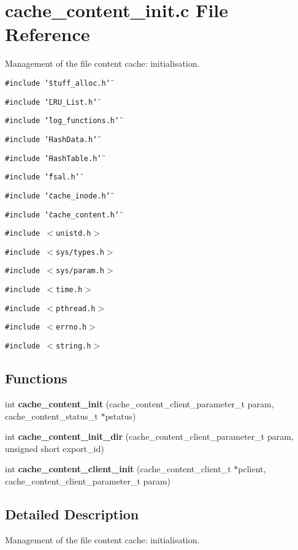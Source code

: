 \section{cache\_\-content\_\-init.c File Reference}
\label{cache__content__init_8c}
Management of the file content cache: initialisation. 

{\tt \#include \char`\"{}stuff\_\-alloc.h\char`\"{}}\par
{\tt \#include \char`\"{}LRU\_\-List.h\char`\"{}}\par
{\tt \#include \char`\"{}log\_\-functions.h\char`\"{}}\par
{\tt \#include \char`\"{}Hash\-Data.h\char`\"{}}\par
{\tt \#include \char`\"{}Hash\-Table.h\char`\"{}}\par
{\tt \#include \char`\"{}fsal.h\char`\"{}}\par
{\tt \#include \char`\"{}cache\_\-inode.h\char`\"{}}\par
{\tt \#include \char`\"{}cache\_\-content.h\char`\"{}}\par
{\tt \#include $<$unistd.h$>$}\par
{\tt \#include $<$sys/types.h$>$}\par
{\tt \#include $<$sys/param.h$>$}\par
{\tt \#include $<$time.h$>$}\par
{\tt \#include $<$pthread.h$>$}\par
{\tt \#include $<$errno.h$>$}\par
{\tt \#include $<$string.h$>$}\par
\subsection*{Functions}
\begin{CompactItemize}
\item 
int {\bf cache\_\-content\_\-init} (cache\_\-content\_\-client\_\-parameter\_\-t param, cache\_\-content\_\-status\_\-t $\ast$pstatus)
\item 
int {\bf cache\_\-content\_\-init\_\-dir} (cache\_\-content\_\-client\_\-parameter\_\-t param, unsigned short export\_\-id)
\item 
int {\bf cache\_\-content\_\-client\_\-init} (cache\_\-content\_\-client\_\-t $\ast$pclient, cache\_\-content\_\-client\_\-parameter\_\-t param)
\end{CompactItemize}


\subsection{Detailed Description}
Management of the file content cache: initialisation. 

